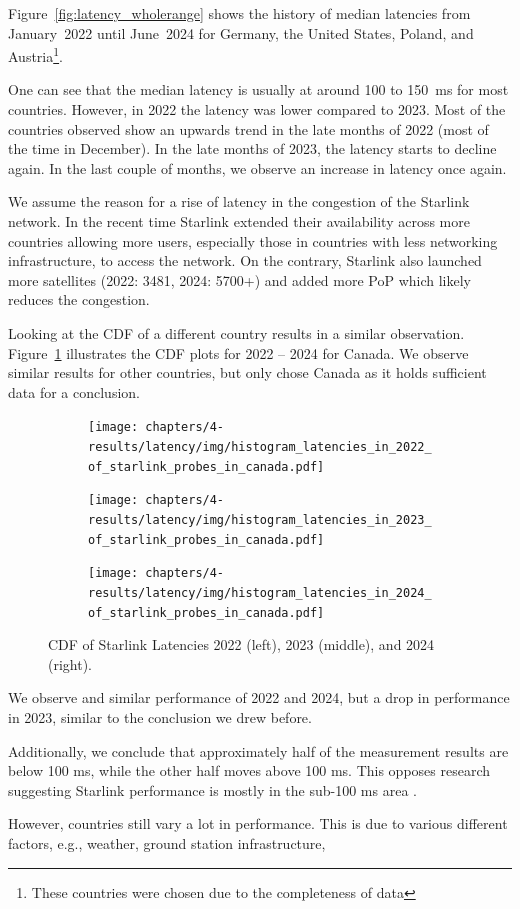 Figure~\ref{fig:latency_wholerange} shows the history of median latencies from January~2022 until June~2024 for Germany, the United States, Poland, and Austria\footnote{These countries were chosen due to the completeness of data}.

One can see that the median latency is usually at around 100 to 150~ms for most countries. However, in 2022 the latency was lower compared to 2023. Most of the countries observed show an upwards trend in the late months of 2022 (most of the time in December). In the late months of 2023, the latency starts to decline again. In the last couple of months, we observe an increase in latency once again.

We assume the reason for a rise of latency in the congestion of the Starlink network. In the recent time Starlink extended their availability across more countries allowing more users, especially those in countries with less networking infrastructure, to access the network.
On the contrary, Starlink also launched more satellites (2022: 3481, 2024: 5700+) and added more \ac{PoP} which likely reduces the congestion.

Looking at the CDF of a different country results in a similar observation. Figure~\ref{fig:latency-cdfs} illustrates the CDF plots for 2022 -- 2024 for Canada. We observe similar results for other countries, but only chose Canada as it holds sufficient data for a conclusion.

\begin{figure}
	\centering
	\begin{subfigure}[b]{0.3\linewidth}
		\texttt{[image: chapters/4-results/latency/img/histogram\_latencies\_in\_2022\_of\_starlink\_probes\_in\_canada.pdf]}
	\end{subfigure}
	\begin{subfigure}[b]{0.3\linewidth}
		\texttt{[image: chapters/4-results/latency/img/histogram\_latencies\_in\_2023\_of\_starlink\_probes\_in\_canada.pdf]}
	\end{subfigure}
	\begin{subfigure}[b]{0.3\linewidth}
		\texttt{[image: chapters/4-results/latency/img/histogram\_latencies\_in\_2024\_of\_starlink\_probes\_in\_canada.pdf]}
	\end{subfigure}
	\caption{CDF of Starlink Latencies 2022 (left), 2023 (middle), and 2024 (right).}
	\label{fig:latency-cdfs}
\end{figure}

We observe and similar performance of 2022 and 2024, but a drop in performance in 2023, similar to the conclusion we drew before.

Additionally, we conclude that approximately half of the measurement results are below 100 ms, while the other half moves above 100 ms. This opposes research suggesting Starlink performance is mostly in the sub-100 ms area \cite{DBLP:conf/www/MohanFCBRMO24, DBLP:conf/icnp/LaiLL20, DBLP:journals/pacmnet/RamanVCSZ23, DBLP:conf/imc/MichelTGB22}.


However, countries still vary a lot in performance. This is due to various different factors, e.g., weather, ground station infrastructure,

